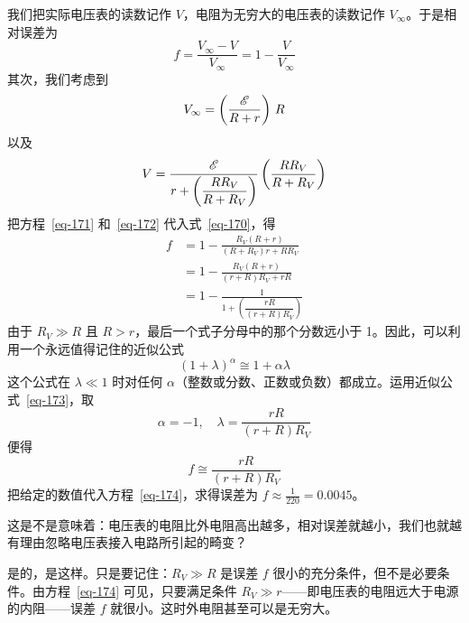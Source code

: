 \begin{dialogue}
我们把实际电压表的读数记作 $V$，电阻为无穷大的电压表的读数记作 $V_{\infty}$。于是相对误差为
\begin{equation}
f  = \frac{V_{\infty} - V}{V_{\infty}} = 1 - \frac{V}{V_{\infty}}
\label{eq-170}
\end{equation}
其次，我们考虑到
\begin{equation}
V_{\infty} = \left( \frac{\mathcal{E}}{R+r} \right) \,R
\label{eq-171}
\end{equation}
以及
\begin{equation}
V = \frac{\mathcal{E}}{r + \left( \dfrac{RR_{V}}{R + R_{V}} \right)} \left( \frac{RR_{V}}{R+R_{V}} \right)
\label{eq-172}
\end{equation}
把方程~\eqref{eq-171} 和~\ref{eq-172} 代入式~\eqref{eq-170}，得
\begin{align*}
f & = 1 - \frac{R_{V} (R + r)}{(R + R_{V})r + RR_{V}} \\
& = 1 - \frac{R_{V} (R + r)}{(r+R)R_{V} + rR} \\
&= 1 - \frac{1}{1+ \left( \dfrac{rR}{(r+R)R_{V}} \right)}
\end{align*}
由于 $R_{V}\gg R$ 且 $R> r$，最后一个式子分母中的那个分数远小于 1。因此，可以利用一个永远值得记住的近似公式
\begin{equation}
(1+\lambda)^{\alpha} \cong 1 + \alpha \lambda
\label{eq-173}
\end{equation}
这个公式在 $\lambda \ll 1$ 时对任何 $\alpha$（整数或分数、正数或负数）都成立。运用近似公式~\eqref{eq-173}，取
\begin{equation*}
\alpha = -1, \quad \lambda = \frac{rR}{(r+R)R_{V}}
\end{equation*}
便得
\begin{equation}
f \cong \frac{rR}{(r+R)R_{V}}
\label{eq-174}
\end{equation}
把给定的数值代入方程~\eqref{eq-174}，求得误差为 $f \approx \frac{1}{220} = 0.0045$。

\stda 这是不是意味着：电压表的电阻比外电阻高出越多，相对误差就越小，我们也就越有理由忽略电压表接入电路所引起的畸变？

\tchr 是的，是这样。只是要记住：$R_{V} \gg R$ 是误差 $f$ 很小的充分条件，但不是必要条件。由方程~\eqref{eq-174} 可见，只要满足条件 $R_{V}\gg r$——即电压表的电阻远大于电源的内阻——误差 $f$ 就很小。这时外电阻甚至可以是无穷大。


\end{dialogue}
